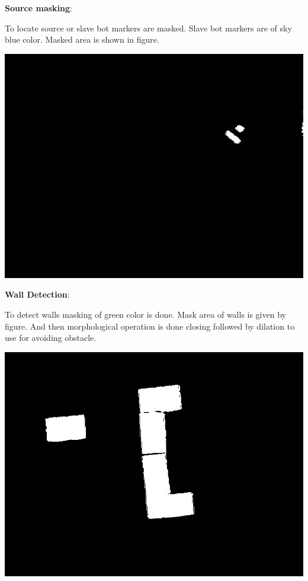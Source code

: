 \documentclass[report]{res}
\begin{document}
	\pagebreak
	
	
	\textbf{Source masking}:
	
	To locate source or slave bot markers are masked. Slave bot markers are of sky blue color. Masked area is shown in figure.
	
	\begin{center}
	\includegraphics[scale =1]{graphics/case1/slave_mask.jpeg}\\
	\end{center}
	
	\pagebreak
	
	
	\textbf{Wall Detection}:
	
	To detect walls masking of green color is done. Mask area of walls is given by figure. And then morphological operation is done closing followed by dilation to use for avoiding obstacle.
	
	\begin{center}
	\includegraphics[scale = 0.8]{graphics/case1/walls_mask.jpeg}\\
	\end{center}
	
\end{document}
